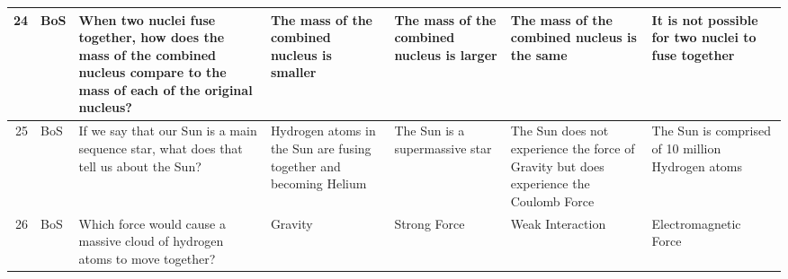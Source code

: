 \documentclass[10pt]{article}
\begin{document}
\begin{tiny}
\begin{longtable}{r|p{0.375in}|p{1.275in}|p{0.75in}|p{0.75in}|p{0.75in}|p{0.75in}}
    24    &     BoS &                                                                                                                                                    When two nuclei fuse together, how does the mass of the combined nucleus compare to the mass of each of the original nucleus? &                                                                                           The mass of the combined nucleus is smaller &                                                            The mass of the combined nucleus is larger &                                                                               The mass of the combined nucleus is the same &                                                                                It is not possible for two nuclei to fuse together \\\hline
    25    &     BoS &                                                                                                                                                                                            If we say that our Sun is a main sequence star, what does that tell us about the Sun? &                                                                     Hydrogen atoms in the Sun are fusing together and becoming Helium &                                                                        The Sun is a supermassive star &                                     The Sun does not experience the force of Gravity but does experience the Coulomb Force &                                                                                 The Sun is comprised of 10 million Hydrogen atoms \\\hline
    26    &     BoS &                                                                                                                                                                                                      Which force would cause a massive cloud of hydrogen atoms to move together? &                                                                                                                               Gravity &                                                                                          Strong Force &                                                                                                           Weak Interaction &                                                                                                             Electromagnetic Force \\\hline

\end{longtable}
\end{tiny}
\end{document}
